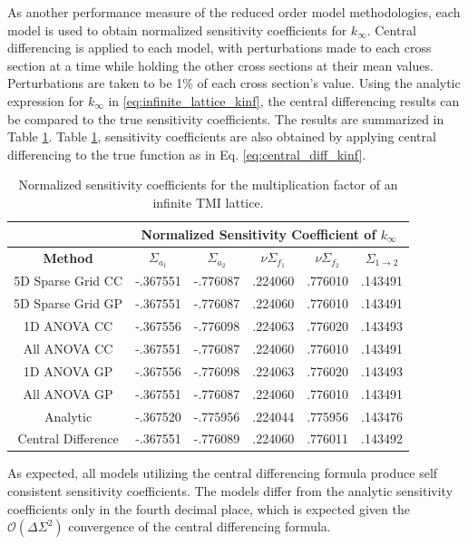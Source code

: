 As another performance measure of the reduced order model methodologies, each model is used to obtain normalized sensitivity coefficients for $k_{\infty}$. Central differencing is applied to each model, with perturbations made to each cross section at a time while holding the other cross sections at their mean values. Perturbations are taken to be 1\% of each cross section's value. Using the analytic expression for $k_{\infty}$ in \ref{eq:infinite_lattice_kinf}, the central differencing results can be compared to the true sensitivity coefficients.   The results are summarized in Table \ref{table:kinf_sensitivities}. Table \ref{table:kinf_sensitivities}, sensitivity coefficients are also obtained by applying central differencing to the true function as in Eq. \ref{eq:central_diff_kinf}. 
\begin{table}
\caption{\label{table:kinf_sensitivities} 
Normalized sensitivity coefficients for the multiplication factor of an infinite TMI lattice.}
\centering
\begin{tabular}{||c|c|c|c|c|c||} 
\hline \hline
  & \multicolumn{5}{|c||}{\textbf{Normalized Sensitivity Coefficient of $k_{\infty}$}}  \\ \hline
\textbf{Method} & $\Sigma_{a_1}$ & $\Sigma_{a_2}$ & $\nu\Sigma_{f_1}$ & $\nu\Sigma_{f_2}$ & $\Sigma_{1\rightarrow 2}$ \\ \hline
5D Sparse Grid CC  & -.367551 & -.776087 & .224060 & .776010 & .143491 \\ \hline
5D Sparse Grid GP  & -.367551 & -.776087 & .224060 & .776010 & .143491 \\ \hline
1D ANOVA CC        & -.367556 & -.776098 & .224063 & .776020 & .143493 \\ \hline
All ANOVA CC       & -.367551 & -.776087 & .224060 & .776010 & .143491 \\ \hline
1D ANOVA GP        & -.367556 & -.776098 & .224063 & .776020 & .143493 \\ \hline
All ANOVA GP       & -.367551 & -.776087 & .224060 & .776010 & .143491 \\ \hline
Analytic           & -.367520 & -.775956 & .224044 & .775956 & .143476 \\ \hline
Central Difference & -.367551 & -.776089 & .224060 & .776011 & .143492 \\
\hline \hline
\end{tabular}
\end{table}
As expected, all models utilizing the central differencing formula produce self consistent sensitivity coefficients. The models differ from the analytic sensitivity coefficients only in the fourth decimal place, which is expected given the $\mathcal{O}(\Delta\Sigma^2)$ convergence  of the central differencing formula.

